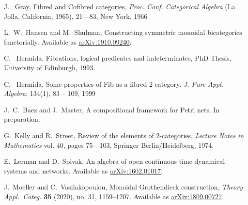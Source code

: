 \documentclass[reqno]{amsart}
\begin{document}
\begin{thebibliography}{100}

 J. \ Gray, Fibred and Cofibred categories, \emph{Proc. Conf. Categorical Algebra} (La Jolla, California, 1965), 21---83, New York, 1966

  L.\ W.\ Hansen and M.\ Shulman, Constructing symmetric monoidal bicategories functorially.  Available as \href{https://arxiv.org/abs/1910.09240}{arXiv:1910.09240}.


 C. \ Hermida, Fibrations, logical predicates and indeterminates, PhD Thesis, University of Edinburgh, 1993.

 C. \ Hermida, Some properties of Fib as a fibred 2-category. \emph{J. Pure Appl. Algebra}, 134(1), 83 -- 109, 1999


 J.\ C.\ Baez and J.\ Master, A compositional framework for Petri nets. In preparation.

 G.\ Kelly and R.\ Street, Review of the elements of 2-categories, \emph{Lecture Notes in Mathematics} vol. 40, pages 75---103, Springer Berlin/Heidelberg, 1974.

 E.\ Lerman and D.\ Spivak, An algebra of open continuous time dynamical systems and networks. Available as \href{http://arxiv.org/abs/1602.01017}{arXiv:1602.01017}.




 J.\ Moeller and C.\ Vasilakopoulou, Monoidal Grothendieck construction, \emph{Theory Appl.\ Categ.} \textbf{35} (2020), no. 31, 1159--1207. Available as \href{https://arxiv.org/abs/1809.00727}{arXiv:1809.00727}.


\end{thebibliography}
\end{document}
